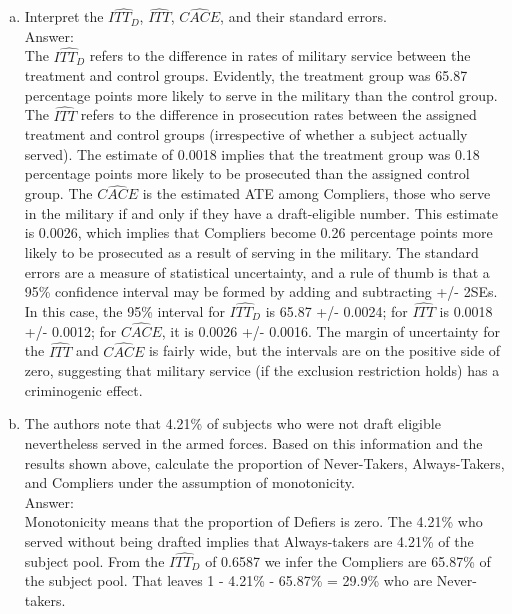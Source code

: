 \documentclass[11pt,notitlepage]{article}\usepackage[]{graphicx}\usepackage[]{color}
\begin{document}
\begin{enumerate}[a)]
\item Interpret the $\widehat{ITT_D}$, $\widehat{ITT}$, $\widehat{CACE}$, and their standard errors.\\
Answer:\\
The $\widehat{ITT_D}$ refers to the difference in rates of military service between the treatment and control groups. Evidently, the treatment group was 65.87 percentage points more likely to serve in the military than the control group. The $\widehat{ITT}$ refers to the difference in prosecution rates between the assigned treatment and control groups (irrespective of whether a subject actually served). The estimate of 0.0018 implies that the treatment group was 0.18 percentage points more likely to be prosecuted than the assigned control group. The $\widehat{CACE}$ is the estimated ATE among Compliers, those who serve in the military if and only if they have a draft-eligible number. This estimate is 0.0026, which implies that Compliers become 0.26 percentage points more likely to be prosecuted as a result of serving in the military. The standard errors are a measure of statistical uncertainty, and a rule of thumb is that a 95\% confidence interval may be formed by adding and subtracting +/- 2SEs. In this case, the 95\% interval for $\widehat{ITT_D}$ is 65.87 +/- 0.0024; for $\widehat{ITT}$ is 0.0018 +/- 0.0012; for $\widehat{CACE}$, it is 0.0026 +/- 0.0016. The margin of uncertainty for the $\widehat{ITT}$ and $\widehat{CACE}$ is fairly wide, but the intervals are on the positive side of zero, suggesting that military service (if the exclusion restriction holds) has a criminogenic effect.

\item The authors note that 4.21\% of subjects who were not draft eligible nevertheless served in the armed forces. Based on this information and the results shown above, calculate the proportion of Never-Takers, Always-Takers, and Compliers under the assumption of monotonicity.\\
Answer:\\
Monotonicity means that the proportion of Defiers is zero. The 4.21\% who served without being drafted implies that Always-takers are 4.21\% of the subject pool. From the $\widehat{ITT_D}$ of 0.6587 we infer the Compliers are 65.87\% of the subject pool. That leaves 1 - 4.21\% - 65.87\% = 29.9\% who are Never-takers.



\end{enumerate}
\end{document}
